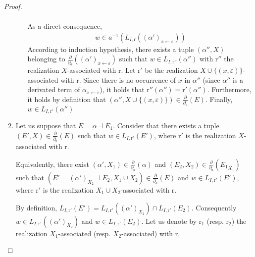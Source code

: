 \documentclass[a4paper]{llncs}
\begin{document}
\begin{proof}
\begin{enumerate}
\begin{enumerate}
\begin{align*}
        \end{align*}        
        As a direct consequence,
        \begin{align*}
          w\in a^{-1}(L_{I,\mathrm{r}}((\alpha')_{x\leftarrow\varepsilon}))
        \end{align*}        
        According to induction hypothesis, there exists a tuple $(\alpha'',X)$ belonging to $\frac{\partial}{\partial_a}((\alpha')_{x\leftarrow\varepsilon})$ such that $w \in L_{I,\mathrm{r}''}(\alpha'')$ with $\mathrm{r}''$ the realization $X$-associated with $\mathrm{r}$. Let $\mathrm{r}'$ be the realization $X\cup \{(x,\varepsilon)\}$-associated with $\mathrm{r}$. Since there is no occurrence of $x$ in $\alpha''$ (since $\alpha''$ is a derivated term of $\alpha_{x\leftarrow\varepsilon}$), it holds that $\mathrm{r}''(\alpha'')=\mathrm{r}'(\alpha'')$. Furthermore, it holds by definition that $(\alpha'',X\cup\{(x,\varepsilon)\})\in \frac{\partial}{\partial_a}(E)$. Finally, $w \in L_{I,\mathrm{r}'}(\alpha'')$
      \end{enumerate}
      \item Let us suppose that $E=\alpha\dashv E_1$. 
      Consider that there exists a tuple $(E',X)\in\frac{\partial}{\partial_a}(E)$ such that $w \in L_{I,\mathrm{r}'}(E')$, where $\mathrm{r}'$ is the realization $X$-associated with $\mathrm{r}$. 
      
      Equivalently, there exist $(\alpha',X_1)\in \frac{\partial}{\partial_a}(\alpha)$ and  $(E_2,X_2)\in \frac{\partial}{\partial_a}({E_1}_{X_1})$ 
      such that $(E'=(\alpha')_{X_2} \dashv E_2,X_1\cup X_2)\in \frac{\partial}{\partial_a}(E)$ and $w \in L_{I,\mathrm{r}'}(E')$, where $\mathrm{r}'$ is the realization $X_1\cup X_2$-associated with $\mathrm{r}$.
      
      By definition, $L_{I,\mathrm{r}'}(E')=L_{I,\mathrm{r}'}((\alpha')_{X_2})\cap L_{I,\mathrm{r}'}(E_2)$. Consequently $w\in L_{I,\mathrm{r}'}((\alpha')_{X_2})$ and $w\in L_{I,\mathrm{r}'}(E_2)$. Let us denote by $\mathrm{r}_1$ (resp. $\mathrm{r}_2$) the realization $X_1$-associated (resp. $X_2$-associated) with $\mathrm{r}$.
      

\end{enumerate}
\end{proof}
\end{document}
